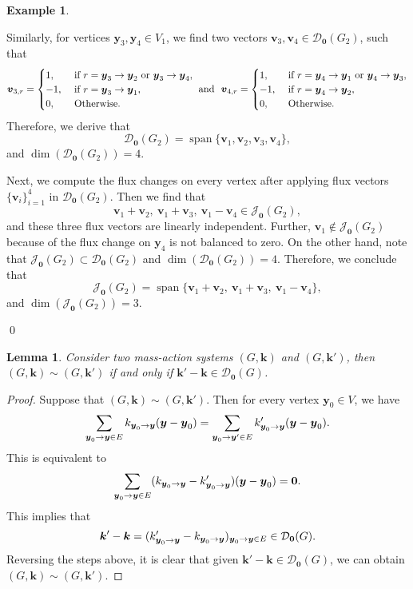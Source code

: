 \documentclass[11pt]{article}
\theoremstyle{plain}
\newtheorem{lemma}[theorem]{Lemma}
\theoremstyle{definition}
\newtheorem{example}[theorem]{Example}
\theoremstyle{remark}
\newcommand\by{\boldsymbol{y}}
\newcommand\bk{\boldsymbol{k}}
\newcommand\bv{\boldsymbol{v}}
\newcommand{\eJ}{\mathcal{J}_{\textbf{0}}}
\newcommand{\mD}{\mathcal{D}_{\textbf{0}}}
\DeclareMathOperator{\spn}{span}
\begin{document}
\begin{example}
\begin{enumerate}
Similarly, for vertices $\by_3, \by_4 \in V_1$, we find two vectors $\bv_3, \bv_4 \in \mD(G_2)$, such that
\begin{equation} \notag
\bv_{3, r} = 
\begin{cases}
1, & \text{ if } r = \by_3 \to \by_2 \text{ or } \by_3 \to \by_4, \\
-1, & \text{ if } r = \by_3 \to \by_1, \\
0, & \text{ Otherwise}.
\end{cases} 
\text{ and } \
\bv_{4, r} = 
\begin{cases}
1, & \text{ if } r = \by_4 \to \by_1 \text{ or } \by_4 \to \by_3, \\
-1, & \text{ if } r = \by_4 \to \by_2, \\
0, & \text{ Otherwise}.
\end{cases}
\end{equation}
Therefore, we derive that 
\[
\mD(G_2) = \spn \{ \bv_1, \bv_2, \bv_3, \bv_4 \},
\]
and $\dim (\mD(G_2)) =  4$.

\medskip

Next, we compute the flux changes on every vertex after applying flux vectors $\{ \bv_i\}^{4}_{i=1}$ in $\mD(G_2)$. Then we find that
\[
\bv_1 + \bv_2, \ \bv_1 + \bv_3, \ \bv_1 - \bv_4 \in \eJ (G_2),
\]
and these three flux vectors are linearly independent. 
Further, $\bv_1 \notin \eJ (G_2)$ because of the flux change on $\by_4$ is not balanced to zero. 
On the other hand, note that $\eJ (G_2) \subset \mD (G_2)$ and $\dim (\mD(G_2)) =  4$.
Therefore, we conclude that 
\[
\eJ (G_2) = \spn \{ \bv_1 + \bv_2, \ \bv_1 + \bv_3, \ \bv_1 - \bv_4 \},
\]
and $\dim (\eJ(G_2)) =  3$.
\end{enumerate}
\qed
\end{example}

\begin{lemma}
\label{lem:d0}
Consider two mass-action systems $(G, \bk)$ and $(G, \bk')$, then $(G, \bk) \sim (G, \bk')$ if and only if $\bk' - \bk \in \mD (G)$.    
\end{lemma}

\begin{proof}
Suppose that $(G, \bk) \sim (G, \bk')$. 
Then for every vertex $\by_0 \in V$, we have
\begin{equation} \notag
\sum_{\by_0 \to \by \in E} k_{\by_0  \to \by} (\by - \by_0) 
= \sum_{\by_0 \to \by' \in E} k'_{\by_0  \to \by}  (\by - \by_0).
\end{equation}
This is equivalent to 
\begin{equation} \notag
\sum_{\by_0 \to \by \in E} (k_{\by_0  \to \by} - k'_{\by_0  \to \by} ) (\by - \by_0) 
= \mathbf{0}.
\end{equation}
This implies that
\begin{equation} \notag
\bk' - \bk = (k'_{\by_0  \to \by} - k_{\by_0  \to \by})_{\by_0  \to \by \in E} \in \mD (G).
\end{equation}
Reversing the steps above, it is clear that given $\bk' - \bk \in \mD (G)$, we can obtain $(G, \bk) \sim (G, \bk')$.
\end{proof}
\end{document}

